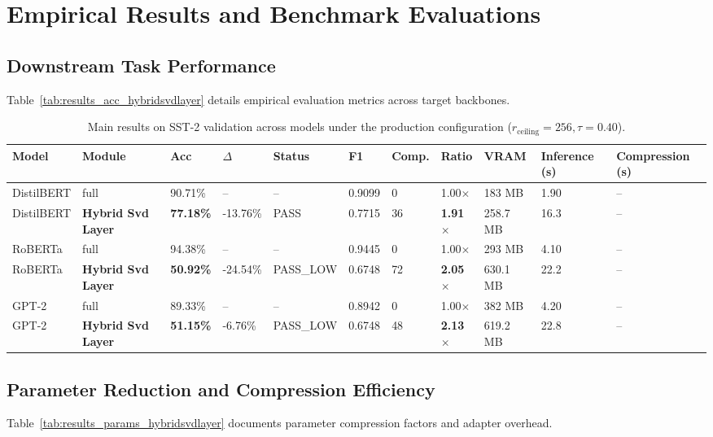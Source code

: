 \section{Empirical Results and Benchmark Evaluations}

\subsection{Downstream Task Performance}
Table~\ref{tab:results_acc_hybridsvdlayer} details empirical evaluation metrics across target backbones.

\begin{table}[t]
\centering
\small
\begin{tabular}{lllllllllll}
\toprule
\textbf{Model} & \textbf{Module} & \textbf{Acc} & \textbf{$\Delta$} & \textbf{Status} & \textbf{F1} & \textbf{Comp.} & \textbf{Ratio} & \textbf{VRAM} & \textbf{Inference (s)} & \textbf{Compression (s)} \\
\midrule
DistilBERT & full & 90.71\% & -- & -- & 0.9099 & 0 & 1.00$\times$ & 183 MB & 1.90 & -- \\
DistilBERT & \textbf{Hybrid Svd Layer} & \textbf{77.18\%} & -13.76\% & PASS & 0.7715 & 36 & \textbf{1.91$\times$} & 258.7 MB & 16.3 & -- \\
RoBERTa & full & 94.38\% & -- & -- & 0.9445 & 0 & 1.00$\times$ & 293 MB & 4.10 & -- \\
RoBERTa & \textbf{Hybrid Svd Layer} & \textbf{50.92\%} & -24.54\% & PASS_LOW & 0.6748 & 72 & \textbf{2.05$\times$} & 630.1 MB & 22.2 & -- \\
GPT-2 & full & 89.33\% & -- & -- & 0.8942 & 0 & 1.00$\times$ & 382 MB & 4.20 & -- \\
GPT-2 & \textbf{Hybrid Svd Layer} & \textbf{51.15\%} & -6.76\% & PASS_LOW & 0.6748 & 48 & \textbf{2.13$\times$} & 619.2 MB & 22.8 & -- \\
\bottomrule
\end{tabular}
\caption{Main results on SST-2 validation across models under the production configuration ($r_{\mathrm{ceiling}}=256, \tau=0.40$).}
\label{tab:main_sst2}
\end{table}

\subsection{Parameter Reduction and Compression Efficiency}
Table~\ref{tab:results_params_hybridsvdlayer} documents parameter compression factors and adapter overhead.

